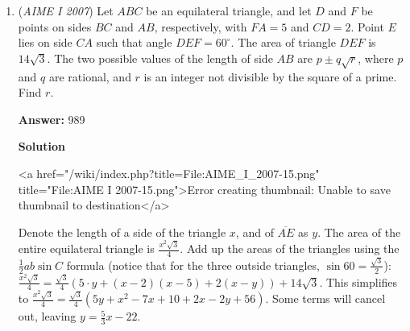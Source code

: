 \begin{enumerate}
 Now we must consider whether this finding holds true for the rest of the sequence we're examining. First of all, notice that each time $n$ increases by $1$, the degrees of both the numerator and denominator increase by $2$, because we are squaring the $n+1th$ term in the numerator while the same term, appearing in the denominator, is being generated in part by squaring the term before it (seen in the relation $a_{n+1}^2 = (\frac{a_{n}^2 + 2007}{a_{n-1}})^2$). Thus, the degree of the numerator will always be one greater than the degree of the denominator; we have only to show that the other terms in the expression remain sufficiently small enough so as not to disturb the $\approx224:1$ ratio between the two. 

 For the non-greatest terms in the expression to offset this ratio for values of $n$ in the ballpark of $2006$, they would have to have massive coefficients, because or else they are dwarfed by the additional $224$ attached to the leading term. Thankfully, this is not the case. Since we are simply squaring previous terms repeatedly to get new terms, we end up getting a sequence that is approximately equal to $\frac{224^k+224^{k-1}+224^{k-2} . . . }{224^{k-1}+224^{k-2} . . . }$ for all $k\geq2$, whose $\lim_{k\to\infty}=$ $\boxed{224}$.

 


 \href{https://mathproblemsolvingskills.wordpress.com/}{MathProblemSolvingSkills.com}

 


 


	\item (\textit{AIME I 2007}) Let $ABC$ be an equilateral triangle, and let $D$ and $F$ be points on sides $BC$ and $AB$, respectively, with $FA = 5$ and $CD = 2$.  Point $E$ lies on side $CA$ such that angle $DEF = 60^{\circ}$.  The area of triangle $DEF$ is $14\sqrt{3}$.  The two possible values of the length of side $AB$ are $p \pm q \sqrt{r}$, where $p$ and $q$ are rational, and $r$ is an integer not divisible by the square of a prime.  Find $r$.


 
 \textbf{Answer: }989



\textbf{Solution}

<a href="/wiki/index.php?title=File:AIME\_I\_2007-15.png" title="File:AIME I 2007-15.png">Error creating thumbnail: Unable to save thumbnail to destination</a>

 Denote the length of a side of the triangle $x$, and of $\overline{AE}$ as $y$. The area of the entire equilateral triangle is $\frac{x^2\sqrt{3}}{4}$. Add up the areas of the triangles using the $\frac{1}{2}ab\sin C$ formula (notice that for the three outside triangles, $\sin 60 = \frac{\sqrt{3}}{2}$): $\frac{x^2\sqrt{3}}{4} = \frac{\sqrt{3}}{4}(5 \cdot y + (x - 2)(x - 5) + 2(x - y)) + 14\sqrt{3}$. This simplifies to $\frac{x^2\sqrt{3}}{4} = \frac{\sqrt{3}}{4}(5y + x^2 - 7x + 10 + 2x - 2y + 56)$. Some terms will cancel out, leaving $y = \frac{5}{3}x - 22$.


\end{enumerate}
